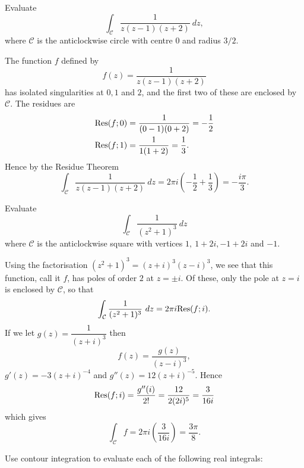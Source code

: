 \begin{questions}
\begin{answer}


\end{answer}
\question Evaluate
\[
\int_{\mathcal{C}} \frac{1}{z(z-1)(z+2)}\ dz,
\]
where $\mathcal{C}$ is the anticlockwise circle with centre $0$ and radius $3/2$.
\begin{answer}
The function $f$ defined by
\[
f(z) = \frac{1}{z(z-1)(z+2)}
\]
has isolated singularities at $0,1$ and $2$, and the first two of these are enclosed by $\mathcal{C}$.  The residues are
\begin{align*}
\mathrm{Res} (f;0) &= \frac{1}{(0-1)(0+2)}  = - \frac{1}{2} \\
 \mathrm{Res} (f;1) & = \frac{1}{1(1+2)}  = \frac{1}{3}.
\end{align*}
Hence by the Residue Theorem
\[
\int_{\mathcal{C}} \frac{1}{z(z-1)(z+2)}\ dz = 2\pi i \left( - \frac{1}{2} + \frac{1}{3} \right) = - \frac{i\pi}{3}.
\]
\end{answer}
\question Evaluate
\[
\int_{\mathcal{C}} \frac{1}{(z^2+1)^3}\ dz
\]
where $\mathcal{C}$ is the anticlockwise square with vertices $1,\ 1+2i, -1+2i$ and $-1$.
\begin{answer}
Using the factorisation $(z^2+1)^3=(z+i)^3(z-i)^3$, we see that this function, call it $f$, has poles of order $2$ at $z=\pm i$.  Of these, only the pole at $z=i$ is enclosed by $\mathcal{C}$, so that 
\[
\int_{\mathcal{C}} \frac{1}{(z^2+1)^3}\ dz = 2\pi i \mathrm{Res} (f;i).
\]
If we let $g(z) = \dfrac{1}{(z+i)^3}$ then
\[
f(z) = \frac{g(z)}{(z-i)^3},
\]
$g'(z) = -3 (z+i)^{-4}$ and $g''(z) = 12(z+i)^{-5}$.  Hence
\[
\mathrm{Res} (f;i) = \frac{g''(i)}{2!} = \frac{12}{2(2i)^5} = \frac{3}{16i}
\]
which gives
\[
\int_{\mathcal{C}} f = 2\pi i \left( \frac{3}{16i} \right) = \frac{3\pi}{8}.
\]
\end{answer}
\question Use contour integration to evaluate each of the following real integrals:
\begin{parts}

\end{parts}
\end{questions}
